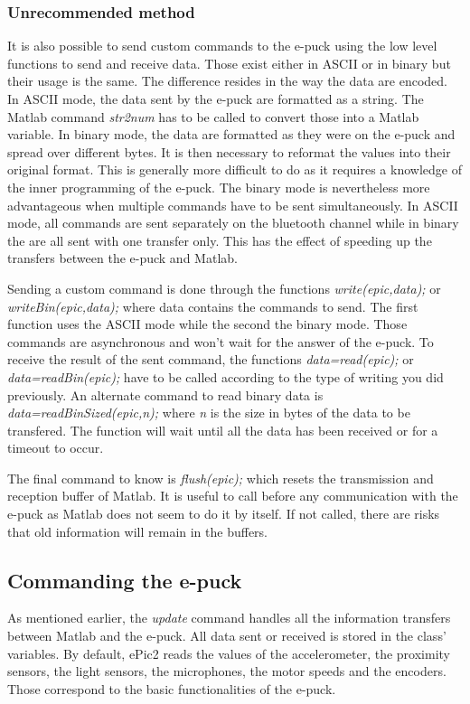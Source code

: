 \documentclass[11pt,oneside,english,a4paper]{article}
\begin{document}
\subsubsection{Unrecommended method}
\par It is also possible to send custom commands to the e-puck using the low level functions to send and receive data. Those exist either in ASCII or in binary but their usage is the same. The difference resides in the way the data are encoded. In ASCII mode, the data sent by the e-puck are formatted as a string. The Matlab command \emph{str2num} has to be called to convert those into a Matlab variable. In binary mode, the data are formatted as they were on the e-puck and spread over different bytes. It is then necessary to reformat the values into their original format. This is generally more difficult to do as it requires a knowledge of the inner programming of the e-puck. The binary mode is nevertheless more advantageous when multiple commands have to be sent simultaneously. In ASCII mode, all commands are sent separately on the bluetooth channel while in binary the are all sent with one transfer only. This has the effect of speeding up the transfers between the e-puck and Matlab.
\par Sending a custom command is done through the functions \emph{write(epic,data);} or \newline \emph{writeBin(epic,data);} where data contains the commands to send. The first function uses the ASCII mode while the second the binary mode. Those commands are asynchronous and won't wait for the answer of the e-puck. To receive the result of the sent command, the functions \emph{data=read(epic);} or \emph{data=readBin(epic);} have to be called according to the type of writing you did previously. An alternate command to read binary data is \emph{data=readBinSized(epic,n);} where \emph{n} is the size in bytes of the data to be transfered. The function will wait until all the data has been received or for a timeout to occur.
\par The final command to know is \emph{flush(epic);} which resets the transmission and reception buffer of Matlab. It is useful to call before any communication with the e-puck as Matlab does not seem to do it by itself. If not called, there are risks that old information will remain in the buffers.

\subsection{Commanding the e-puck}
\label{sec:commands}
As mentioned earlier, the \emph{update} command handles all the information transfers between Matlab and the e-puck. All data sent or received is stored in the class' variables. By default, ePic2 reads the values of the accelerometer, the proximity sensors, the light sensors, the microphones, the motor speeds and the encoders. Those correspond to the basic functionalities of the e-puck.
\end{document}
